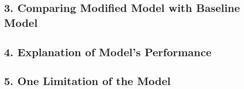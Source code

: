 \documentclass[12pt]{article}
\begin{document}
\subsection*{3. Comparing Modified Model with Baseline Model}
\subsection*{4. Explanation of Model's Performance}
\subsection*{5. One Limitation of the Model}
\end{document}
